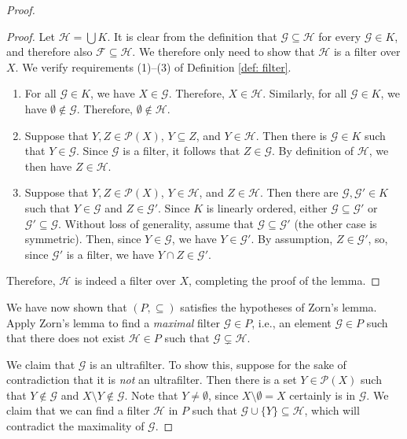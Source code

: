 \documentclass[a4paper]{memoir}
\theoremstyle{definition}
\newcommand{\mc}{\mathcal}
\newcommand{\power}{\ensuremath{\mathscr{P}}}
\begin{document}
\begin{proof}
  \begin{proof}
    Let $\mc{H} = \bigcup K$. It is clear from the definition that $\mc{G} \subseteq \mc{H}$ 
    for every $\mc{G} \in K$, and therefore also $\mc{F} \subseteq \mc{H}$. We therefore only 
    need to show that $\mc{H}$ is a filter over $X$. We verify requirements (1)--(3) of 
    Definition \ref{def: filter}.
    \begin{enumerate}
      \item For all $\mc{G} \in K$, we have $X \in \mc{G}$. Therefore, $X \in \mc{H}$. Similarly, 
      for all $\mc{G} \in K$, we have $\emptyset \notin \mc{G}$. Therefore, $\emptyset \notin 
      \mc{H}$.
      \item Suppose that $Y,Z \in \power(X)$, $Y \subseteq Z$, and $Y \in \mc{H}$. Then there is 
      $\mc{G} \in K$ such that $Y \in \mc{G}$. Since $\mc{G}$ is a filter, it follows that 
      $Z \in \mc{G}$. By definition of $\mc{H}$, we then have $Z \in \mc{H}$.
      \item Suppose that $Y,Z \in \power(X)$, $Y \in \mc{H}$, and $Z \in \mc{H}$. Then there are 
      $\mc{G}, \mc{G}' \in K$ such that $Y \in \mc{G}$ and $Z \in \mc{G}'$. Since $K$ is 
      linearly ordered, either $\mc{G} \subseteq \mc{G}'$ or $\mc{G}' \subseteq \mc{G}$. Without 
      loss of generality, assume that $\mc{G} \subseteq \mc{G}'$ (the other case is 
      symmetric). Then, since $Y \in \mc{G}$, we have $Y \in \mc{G}'$. By assumption, 
      $Z \in \mc{G}'$, so, since $\mc{G}'$ is a filter, we have $Y \cap Z \in \mc{G}'$.
    \end{enumerate}
    Therefore, $\mc{H}$ is indeed a filter over $X$, completing the proof of the lemma. 
  \end{proof}
  
  We have now shown that $(P, \subseteq)$ satisfies the hypotheses of Zorn's lemma. Apply 
  Zorn's lemma to find a \emph{maximal} filter $\mathcal{G} \in P$, i.e., an element 
  $\mathcal{G} \in P$ such that there does not exist $\mathcal{H} \in P$ such that 
  $\mathcal{G} \subsetneq \mathcal{H}$. 
  
  We claim that $\mathcal{G}$ is an ultrafilter. To show this, suppose for the sake of 
  contradiction that it is \emph{not} an ultrafilter. Then there is a set $Y \in \power(X)$ 
  such that $Y \notin \mathcal{G}$ and $X \setminus Y \notin \mathcal{G}$. Note that 
  $Y \neq \emptyset$, since $X \setminus \emptyset = X$ certainly is in $\mathcal{G}$. 
  We claim that we can find a filter $\mathcal{H}$ in $P$ such that 
  $\mathcal{G} \cup \{Y\} \subseteq \mathcal{H}$, which will contradict the maximality 
  of $\mathcal{G}$. 
  

\end{proof}
\end{document}
